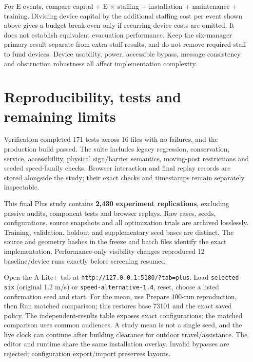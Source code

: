 \documentclass[11pt,a4paper]{article}
\newcommand{\code}[1]{{\small\nolinkurl{#1}}}
\begin{document}
For E events, compare capital + E \ensuremath{\times} staffing + installation + maintenance + training. Dividing device capital by the additional staffing cost per event shown above gives a budget break-even only if recurring device costs are omitted. It does not establish equivalent evacuation performance. Keep the six-manager primary result separate from extra-staff results, and do not remove required staff to fund devices. Device usability, power, accessible bypass, message consistency and obstruction robustness all affect implementation complexity.


\section{Reproducibility, tests and remaining limits}

Verification completed 171 tests across 16 files with no failures, and the production build passed. The suite includes legacy regression, conservation, service, accessibility, physical sign/barrier semantics, moving-post restrictions and seeded speed-family checks. Browser interaction and final replay records are stored alongside the study; their exact checks and timestamps remain separately inspectable.


This final Plus study contains \textbf{2,430 experiment replications}, excluding passive audits, component tests and browser replays. Raw cases, seeds, configurations, source snapshots and all optimization trials are archived losslessly. Training, validation, holdout and supplementary seed bases are distinct. The source and geometry hashes in the freeze and batch files identify the exact implementation. Performance-only visibility changes reproduced 12 baseline/device runs exactly before screening resumed.


Open the A-Lite+ tab at \code{http://127.0.0.1:5180/?tab=plus}. Load \code{selected-six} (original 1.2 m/s) or \code{speed-alternative-1.4}, reset, choose a listed confirmation seed and start. For the mean, use Prepare 100-run reproduction, then Run matched comparison; this restores base 73101 and the exact saved policy. The independent-results table exposes exact configurations; the matched comparison uses common audiences. A study mean is not a single seed, and the live clock can continue after building clearance for outdoor travel/assistance. The editor and runtime share the same installation overlay. Invalid bypasses are rejected; configuration export/import preserves layouts.
\end{document}
